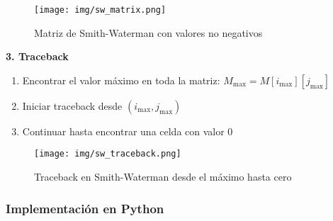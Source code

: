 \documentclass[12pt,a4paper]{article}
\begin{document}
\begin{figure}[H]
\centering
\texttt{[image: img/sw\_matrix.png]}
\caption{Matriz de Smith-Waterman con valores no negativos}
\label{fig:sw_matrix}
\end{figure}

\textbf{3. Traceback}

\begin{enumerate}
    \item Encontrar el valor máximo en toda la matriz: $M_{\max} = M[i_{\max}][j_{\max}]$
    \item Iniciar traceback desde $(i_{\max}, j_{\max})$
    \item Continuar hasta encontrar una celda con valor 0
\end{enumerate}

\begin{figure}[H]
\centering
\texttt{[image: img/sw\_traceback.png]}
\caption{Traceback en Smith-Waterman desde el máximo hasta cero}
\label{fig:sw_traceback}
\end{figure}

\subsubsection{Implementación en Python}
\end{document}
